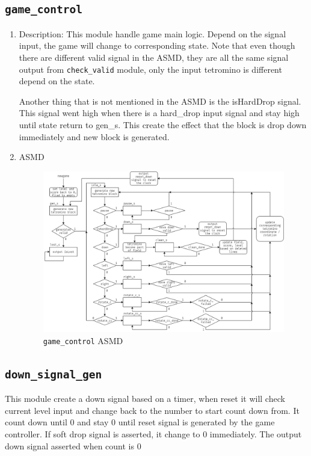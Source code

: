 \documentclass[scale = 0.9]{article}
\newcommand{\code}[1]{\colorbox{light-gray}{\texttt{#1}}} %
\begin{document}
\subsection{\code{game\_control}}
\begin{enumerate}[label=(\alph*)]
  \item Description:
        This module handle game main logic. Depend on the signal input, the game will
        change to corresponding state. Note that even though there are different valid
        signal in the ASMD, they are all the same signal output from \code{check\_valid}
        module, only the input tetromino is different depend on the state.

        Another thing that is not mentioned in the ASMD is the isHardDrop signal. This
        signal went high when there is a hard\_drop input signal and stay high until
        state return to gen\_s. This create the effect that the block is drop down
        immediately and new block is generated.
  \item ASMD
        \begin{figure}[H]
          \begin{center}
            \includegraphics[width=\textwidth]{game_control.png}
            \caption{\code{game\_control} ASMD}\label{game_control_ASMD}
          \end{center}
        \end{figure}
\end{enumerate}

\subsection{\code{down\_signal\_gen}}
This module create a down signal based on a timer, when reset it will check current
level input and change back to the number to start count down from. It count down
until 0 and stay 0 until reset signal is generated by the game controller. If soft
drop signal is asserted, it change to 0 immediately. The output down signal asserted
when count is 0
\end{document}
